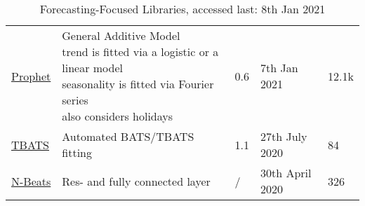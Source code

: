 \begin{table}[h]
{\begin{tabular}{lllll}
            \href{https://github.com/facebook/prophet}{Prophet}                                         & \makecell[l]{General Additive Model\\\tabitem{} trend is fitted via a logistic or a linear model\\\tabitem{} seasonality is fitted via Fourier series\\\tabitem{} also considers holidays}                                                                                                                                              & 0.6       & 7th Jan 2021          & 12.1k \\\addlinespace
            \href{https://github.com/intive-DataScience/tbats}{TBATS}                                   & Automated BATS/TBATS fitting                                                                                                                                                                                                                                                                                                      & 1.1       & 27th July 2020        & 84    \\\addlinespace
            \href{https://github.com/philipperemy/n-beats}{N-Beats}                                     & Res- and fully connected layer                                                                                                                                                                                                                                                                                                    & /         & 30th April 2020       & 326   \\
        \end{tabular}
    }
    \caption{Forecasting-Focused Libraries, accessed last: 8th Jan 2021}\label{tab:forecasting-packages}
\end{table}

